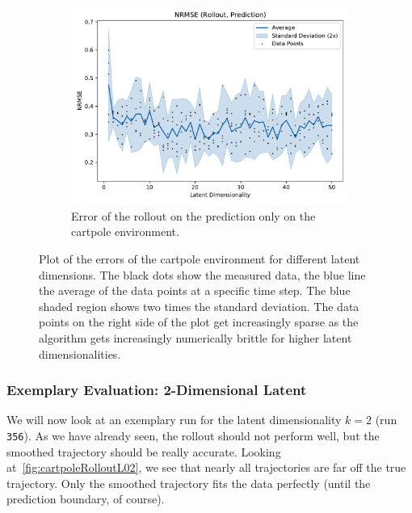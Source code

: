 \begin{figure}
\begin{subfigure}{0.5\linewidth}
					\label{fig:cartpoleRmseTrain}
				\end{subfigure}%
				~
				\begin{subfigure}{0.5\linewidth}
					\centering
					\includegraphics[width=\linewidth]{figures/results/cartpole-gym/latent-dim/comparison-rmse-rollout-prediction-normalized-mean-vs-latent-dim.pdf}
					\caption{Error of the rollout on the prediction only on the cartpole environment.}
					\label{fig:cartpoleRmsePred}
				\end{subfigure}
				\caption{Plot of the errors of the cartpole environment for different latent dimensions. The black dots show the measured data, the blue line the average of the data points at a specific time step. The blue shaded region shows two times the standard deviation. The data points on the right side of the plot get increasingly sparse as the algorithm gets increasingly numerically brittle for higher latent dimensionalities.}
				\label{fig:cartpoleRmse}
			\end{figure}

		\subsubsection{Exemplary Evaluation: 2-Dimensional Latent}
			We will now look at an exemplary run for the latent dimensionality \( k = 2 \) (run \texttt{356}). As we have already seen, the rollout should not perform well, but the smoothed trajectory should be really accurate. Looking at~\autoref{fig:cartpoleRolloutL02}, we see that nearly all trajectories are far off the true trajectory. Only the smoothed trajectory fits the data perfectly (until the prediction boundary, of course).

